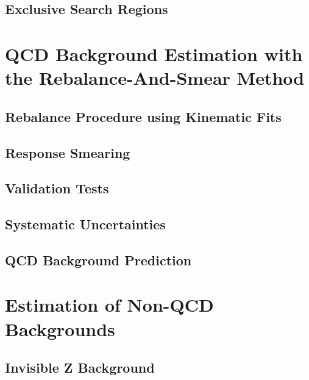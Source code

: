 \subsection{Exclusive Search Regions}
\label{subsec:RA2_search_regions}

\section{QCD Background Estimation with the Rebalance-And-Smear Method}
\label{subsec:RA2_QCD}

\subsection{Rebalance Procedure using Kinematic Fits}
\label{subsec:RA2_reb}

\subsection{Response Smearing}
\label{subsec:RA2_smear}

\subsection{Validation Tests}
\label{subsec:RA2_clsoure}

\subsection{Systematic Uncertainties}
\label{subsec:RA2_syst_unc}

\subsection{QCD Background Prediction}
\label{subsec:RA2_qcd_pred}

\section{Estimation of Non-QCD Backgrounds}
\label{sec:RA2_Non-QCD}

\subsection{Invisible Z Background}
\label{subsec:RA2_Zinv}

